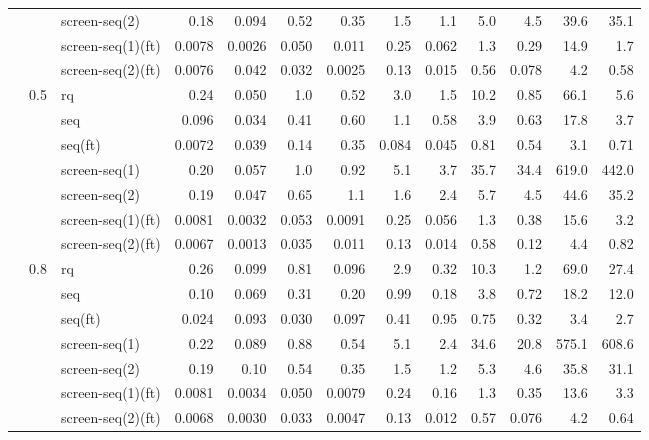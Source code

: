 \begin{longtable}{lllrrrrrrrrrr}
 &  & screen-seq(2) & 0.18 & 0.094 & 0.52 & 0.35 & 1.5 & 1.1 & 5.0 & 4.5 & 39.6 & 35.1\\
 &  & screen-seq(1)(ft) & 0.0078 & 0.0026 & 0.050 & 0.011 & 0.25 & 0.062 & 1.3 & 0.29 & 14.9 & 1.7\\
 &  & screen-seq(2)(ft) & 0.0076 & 0.042 & 0.032 & 0.0025 & 0.13 & 0.015 & 0.56 & 0.078 & 4.2 & 0.58\\
\midrule
 & 0.5 & rq & 0.24 & 0.050 & 1.0 & 0.52 & 3.0 & 1.5 & 10.2 & 0.85 & 66.1 & 5.6\\
 &  & seq & 0.096 & 0.034 & 0.41 & 0.60 & 1.1 & 0.58 & 3.9 & 0.63 & 17.8 & 3.7\\
 &  & seq(ft) & 0.0072 & 0.039 & 0.14 & 0.35 & 0.084 & 0.045 & 0.81 & 0.54 & 3.1 & 0.71\\
 &  & screen-seq(1) & 0.20 & 0.057 & 1.0 & 0.92 & 5.1 & 3.7 & 35.7 & 34.4 & 619.0 & 442.0\\
 &  & screen-seq(2) & 0.19 & 0.047 & 0.65 & 1.1 & 1.6 & 2.4 & 5.7 & 4.5 & 44.6 & 35.2\\
 &  & screen-seq(1)(ft) & 0.0081 & 0.0032 & 0.053 & 0.0091 & 0.25 & 0.056 & 1.3 & 0.38 & 15.6 & 3.2\\
 &  & screen-seq(2)(ft) & 0.0067 & 0.0013 & 0.035 & 0.011 & 0.13 & 0.014 & 0.58 & 0.12 & 4.4 & 0.82\\
\midrule
 & 0.8 & rq & 0.26 & 0.099 & 0.81 & 0.096 & 2.9 & 0.32 & 10.3 & 1.2 & 69.0 & 27.4\\
 &  & seq & 0.10 & 0.069 & 0.31 & 0.20 & 0.99 & 0.18 & 3.8 & 0.72 & 18.2 & 12.0\\
 &  & seq(ft) & 0.024 & 0.093 & 0.030 & 0.097 & 0.41 & 0.95 & 0.75 & 0.32 & 3.4 & 2.7\\
 &  & screen-seq(1) & 0.22 & 0.089 & 0.88 & 0.54 & 5.1 & 2.4 & 34.6 & 20.8 & 575.1 & 608.6\\
 &  & screen-seq(2) & 0.19 & 0.10 & 0.54 & 0.35 & 1.5 & 1.2 & 5.3 & 4.6 & 35.8 & 31.1\\
 &  & screen-seq(1)(ft) & 0.0081 & 0.0034 & 0.050 & 0.0079 & 0.24 & 0.16 & 1.3 & 0.35 & 13.6 & 3.3\\
 &  & screen-seq(2)(ft) & 0.0068 & 0.0030 & 0.033 & 0.0047 & 0.13 & 0.012 & 0.57 & 0.076 & 4.2 & 0.64\\
\midrule
\end{longtable}
\endgroup

